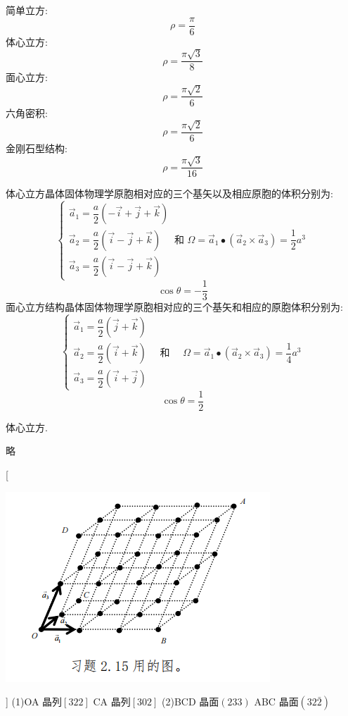 \documentclass[UTF8,10pt,a4paper,oneside]{ctexart}
\begin{document}
    {简单立方:\[\rho=\dfrac{\pi}{6}\]
    体心立方:\[\rho=\dfrac{\pi \sqrt{3}}{8}\]
    面心立方:\[\rho=\dfrac{\pi \sqrt{2} }{6}\]
    六角密积:\[\rho=\dfrac{\pi \sqrt{2} }{6}\]
    金刚石型结构:\[\rho=\dfrac{\pi \sqrt{3} }{16}\]}

    {体心立方晶体固体物理学原胞相对应的三个基矢以及相应原胞的体积分别为:\[\left\{\begin{array}{l}
     \vec{a}_{1}=\dfrac{a}{2}(-\vec{i}+\vec{j}+\vec{k}) \\
     \vec{a}_{2}=\dfrac{a}{2}(\vec{i}-\vec{j}+\vec{k}) \quad \text { 和 } \Omega=\vec{a}_{1} \bullet\left(\vec{a}_{2} \times \vec{a}_{3}\right)=\dfrac{1}{2} a^{3} \\
     \vec{a}_{3}=\dfrac{a}{2}(\vec{i}-\vec{j}+\vec{k}) 
    \end{array}\right.\]  \[\cos \theta=-\dfrac{1}{3}\] 面心立方结构晶体固体物理学原胞相对应的三个基矢和相应的原胞体积分别为:\[\left\{\begin{array}{l}
    \vec{a}_{1}=\dfrac{a}{2}(\vec{j}+\vec{k}) \\
    \vec{a}_{2}=\dfrac{a}{2}(\vec{i}+\vec{k}) \quad \text { 和 } \quad \Omega=\vec{a}_{1} \bullet\left(\vec{a}_{2} \times \vec{a}_{3}\right)=\dfrac{1}{4} a^{3}  \\
     \vec{a}_{3}=\dfrac{a}{2}(\vec{i}+\vec{j}) 
     \end{array}\right.\] \[ \cos \theta=\dfrac{1}{2}\]}

    {体心立方.}

    {略}

    [\begin{center} \includegraphics{picture/2-15.png} \end{center}]
    {(1)OA 晶列$[322]$  CA 晶列$[302]$\newline
    (2)BCD 晶面$(233)$ ABC 晶面$(32\bar{2})$}
\end{document}
